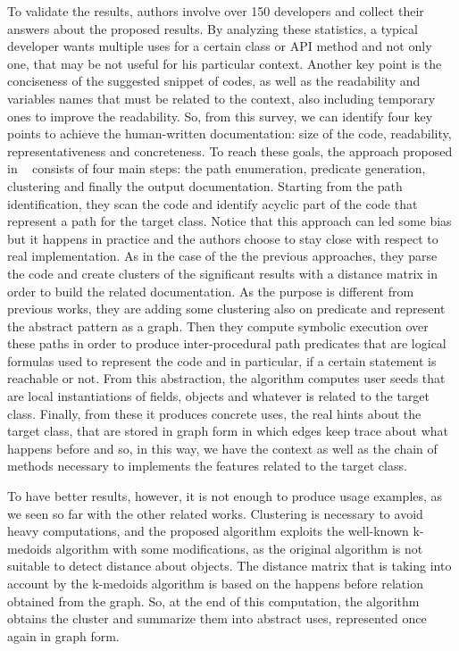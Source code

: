 To validate the results, authors involve over 150 developers and collect their 
answers about the proposed results. By analyzing these statistics, a typical 
developer wants multiple uses for a certain class or API method and not only 
one, that may be not useful for his particular context. Another key point is 
the conciseness of the suggested snippet of codes, as well as the readability 
and variables names that must be related to the context, also including 
temporary ones to improve the readability. So, from this survey, we can 
identify four key points to achieve the human-written documentation: size of 
the code, readability, representativeness and concreteness. 
To reach these goals, the approach proposed in ~\cite{buse_synthesizing_2012} 
consists of four main steps: the path enumeration, predicate generation, 
clustering and finally the output documentation. Starting from the path 
identification, they scan the code and identify acyclic part of the code that 
represent a path for the target class. Notice that this approach can led some 
bias but it happens in practice and the authors choose to stay close with 
respect to real implementation. As in the case of the the previous approaches, 
they parse the code and create clusters of the significant results with a 
distance matrix in order to build the related documentation. As the purpose is 
different from previous works, they are adding some clustering also on 
predicate and represent the abstract pattern as a graph. Then they compute 
symbolic execution over these paths in order to produce inter-procedural path 
predicates that are logical formulas used to represent the code and in 
particular, if a certain statement is reachable or not. From this abstraction, 
the algorithm computes user seeds that are local instantiations of fields, 
objects and whatever is related to the target class. Finally, from these it 
produces concrete uses, the real hints about the target class, that are stored 
in graph form in which edges keep trace about what happens before and so, in 
this way, we have the context as well as the chain of methods necessary to 
implements the features related to the target class. 

To have better results, however, it is not enough to produce usage examples, as 
we seen so far with the other related works. Clustering is necessary to avoid 
heavy computations, and the proposed algorithm exploits the well-known 
k-medoids algorithm with some modifications, as the original algorithm is not 
suitable to detect distance about objects. The distance matrix that is taking 
into account by the k-medoids algorithm is based on the happens before relation 
obtained from the graph. So, at the end of this computation, the algorithm 
obtains the cluster and summarize them into abstract uses, represented once 
again in graph form. 

